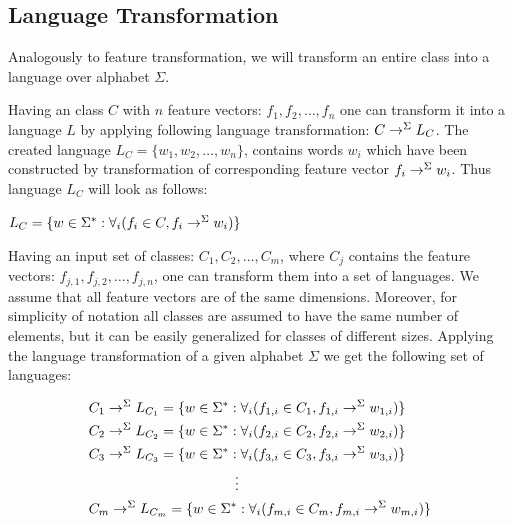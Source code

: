 \documentclass{mini}
\begin{document}
\subsection{Language Transformation}\label{sec:lan_theory_transf_lan}
Analogously to feature transformation, we will transform an entire class into a language over alphabet $\Sigma$.

Having an class $C$ with $n$ feature vectors: $f_1, f_2,\ldots,f_n$ one can transform it into a language $L$ by applying following language transformation: $C \rightarrow^{\Sigma} L_{C}$. The created language $L_{C} = \{w_1, w_2,\ldots,w_n\}$, contains words $w_i$ which have been constructed by transformation of corresponding feature vector $f_i \rightarrow^{\Sigma} w_i$. Thus language $L_{C}$ will look as follows:
\begin{center}
    $L_{C} = \{w \in \Sigma^{*} : \forall_{i} (f_{i} \in C, f_{i} \rightarrow^{\Sigma} w_{i}) \}$
\end{center}

Having an input set of classes: $C_{1},C_{2},\ldots,C_{m}$, where $C_{j}$ contains the feature vectors: $f_{j,1},f_{j,2},\ldots,f_{j,n}$, one can transform them into a set of languages. We assume that all feature vectors are of the same dimensions. Moreover, for simplicity of notation all classes are assumed to have the same number of elements, but it can be easily generalized for classes of different sizes. Applying the language transformation of a given alphabet $\Sigma$ we get the following set of languages:


\begin{align*}
&C_{1} \featureTransformationLanguage{\Sigma} L_{C_1} = \{w \in \Sigma^{*} : \forall_{i} (f_{1,i} \in C_{1}, f_{1,i} \featureTransformationWord{\Sigma} w_{1,i}) \} \\
&C_{2} \featureTransformationLanguage{\Sigma} L_{C_2} = \{w \in \Sigma^{*} : \forall_{i} (f_{2,i} \in C_{2}, f_{2,i} \featureTransformationWord{\Sigma} w_{2,i}) \} \\
&C_{3} \featureTransformationLanguage{\Sigma} L_{C_3} = \{w \in \Sigma^{*} : \forall_{i} (f_{3,i} \in C_{3}, f_{3,i} \featureTransformationWord{\Sigma} w_{3,i}) \} \\
&\makebox[\widthof{${}C_{1}xxxxxxxxxxxxxxxxxxxxxxxxxxxxxxxxxxx{}$}][c]{\vdots} \\
&C_{m} \featureTransformationLanguage{\Sigma} L_{C_m} = \{w \in \Sigma^{*} : \forall_{i} (f_{m,i} \in C_{m}, f_{m,i} \featureTransformationWord{\Sigma} w_{m,i}) \}
\end{align*}
\end{document}
